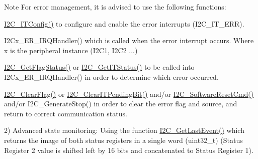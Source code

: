 \begin{DoxyItemize}
\begin{DoxyItemize}
\begin{DoxyNote}{Note}
For error management, it is advised to use the following functions\+:
\begin{DoxyItemize}
\item \hyperlink{group___i2_c___private___functions_ga58fed146a06cb81d2940604e460de047}{I2\+C\+\_\+\+I\+T\+Config()} to configure and enable the error interrupts (I2\+C\+\_\+\+I\+T\+\_\+\+E\+RR).
\item I2\+Cx\+\_\+\+E\+R\+\_\+\+I\+R\+Q\+Handler() which is called when the error interrupt occurs. Where x is the peripheral instance (I2\+C1, I2\+C2 ...)
\item \hyperlink{group___i2_c___private___functions_ga15c95d0ed124f029621a2061b1677ee7}{I2\+C\+\_\+\+Get\+Flag\+Status()} or \hyperlink{group___i2_c___private___functions_ga447771fbbd94a56f3570b9f430a069ba}{I2\+C\+\_\+\+Get\+I\+T\+Status()} to be called into I2\+Cx\+\_\+\+E\+R\+\_\+\+I\+R\+Q\+Handler() in order to determine which error occurred.
\item \hyperlink{group___i2_c___private___functions_ga9d4f8fe9f7232696114b5578b1223963}{I2\+C\+\_\+\+Clear\+Flag()} or \hyperlink{group___i2_c___private___functions_ga110dda440fa200b5f77349df19b3e6bb}{I2\+C\+\_\+\+Clear\+I\+T\+Pending\+Bit()} and/or \hyperlink{group___i2_c___private___functions_ga1289c908aeb882443aba323b459c638b}{I2\+C\+\_\+\+Software\+Reset\+Cmd()} and/or I2\+C\+\_\+\+Generate\+Stop() in order to clear the error flag and source, and return to correct communication status.
\end{DoxyItemize}
\end{DoxyNote}
2) Advanced state monitoring\+: Using the function \hyperlink{group___i2_c___private___functions_ga29237aea9b5a3ead33167e1d027e9f1a}{I2\+C\+\_\+\+Get\+Last\+Event()} which returns the image of both status registers in a single word (uint32\+\_\+t) (Status Register 2 value is shifted left by 16 bits and concatenated to Status Register 1).
\end{DoxyItemize}
\end{DoxyItemize}

